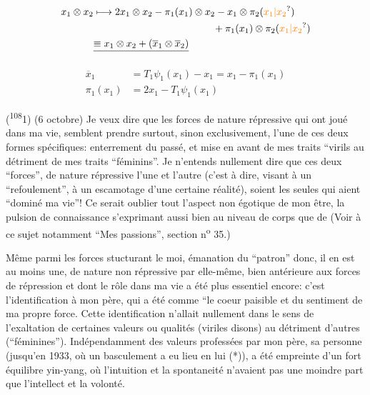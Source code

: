 \[
\begin{aligned}
x_1\otimes x_2&\longmapsto 2x_1\otimes x_2-\pi_1(x_1)\otimes x_2-x_1\otimes\pi_2(\unsure{x_1|x_2})\\
&\hspace{12em}+\pi_1(x_1)\otimes\pi_2(\unsure{x_1|x_2})\\
&\deleted{\equiv x_1\otimes x_2+(\overline{x}_1\otimes\overline{x}_2)}
\end{aligned}
\]

\[
\begin{aligned}
\overline{x}_1&=T_1\psi_1(x_1)-x_1=x_1-\pi_1(x_1)\\
\pi_1(x_1)&=2x_1-T_1\psi_1(x_1)
\end{aligned}
\]

(\textsuperscript{108}1) (6 octobre) Je veux dire que les forces de nature répressive qui ont joué dans ma vie, semblent prendre surtout, sinon exclusivement, l'une de ces deux formes spécifiques: enterrement du passé, et mise en avant de mes traits ``virils au détriment de mes traits ``féminins''. Je n'entends nullement dire que ces deux ``forces'', de nature répressive l'une et l'autre (c'est à dire, visant à un ``refoulement'', à un escamotage d'une certaine réalité), soient les seules qui aient ``dominé ma vie''! Ce serait oublier tout l'aspect non égotique de mon être, la pulsion de connaissance s'exprimant aussi bien au niveau de corps que de  (Voir à ce sujet notamment ``Mes passions'', section n\textsuperscript{o} 35.)

Même parmi les forces stucturant le moi, émanation du ``patron'' donc, il en est au moins une, de nature non répressive par elle-même, bien antérieure aux forces de répression et dont le rôle dans ma vie a été plus essentiel encore: c'est l'identification à mon père, qui a été comme ``le coeur paisible et  du sentiment de ma propre force. Cette identification n'allait nullement dans le sens de l'exaltation de certaines valeurs ou qualités (viriles disons) au détriment d'autres (``féminines''). Indépendamment des valeurs professées par mon père, sa personne (jusqu'en 1933, où un basculement a eu lieu en lui (*)), a été empreinte d'un fort équilibre yin-yang, où l'intuition et la spontaneité n'avaient pas une moindre part que l'intellect et la volonté.

